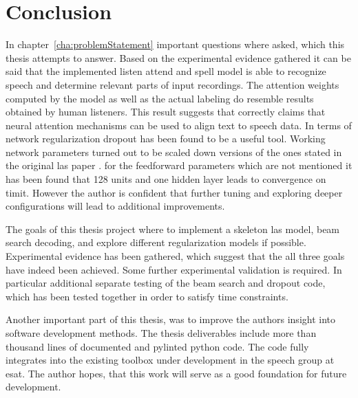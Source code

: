 \chapter{Conclusion}
In chapter~\ref{cha:problemStatement} important questions where asked, which this thesis attempts to answer.
Based on the experimental evidence gathered it can be said that the implemented listen attend and spell model is able to recognize speech and determine relevant parts of input recordings. The attention weights computed by the model as well as the actual labeling do resemble results obtained by human listeners. This result suggests that \cite{Chan2015} correctly claims that neural attention mechanisms can be used to align text to speech data. In terms of network regularization dropout \cite{Srivastava2014} has been found to be a useful tool. Working network parameters turned out to be scaled down versions of the ones stated in the original las paper \cite{Chan2015}. for the feedforward parameters which are not mentioned it has been found that 128 units and one hidden layer leads to convergence on timit. However the author is confident that further tuning and exploring deeper configurations will lead to additional improvements.

The goals of this thesis project where to implement a skeleton las model, beam search decoding, and explore different regularization models if possible.
Experimental evidence has been gathered, which suggest that the all three goals have indeed been achieved. Some further experimental validation is required. In particular additional separate testing of the beam search and dropout code, which has been tested together in order to satisfy time constraints. 



Another important part of this thesis, was to improve the authors insight into software development methods. The thesis deliverables include more than thousand lines of documented and pylinted python code. The code fully integrates into the existing toolbox under development in the speech group at esat. The author hopes, that this work will serve as a good foundation for future development.  